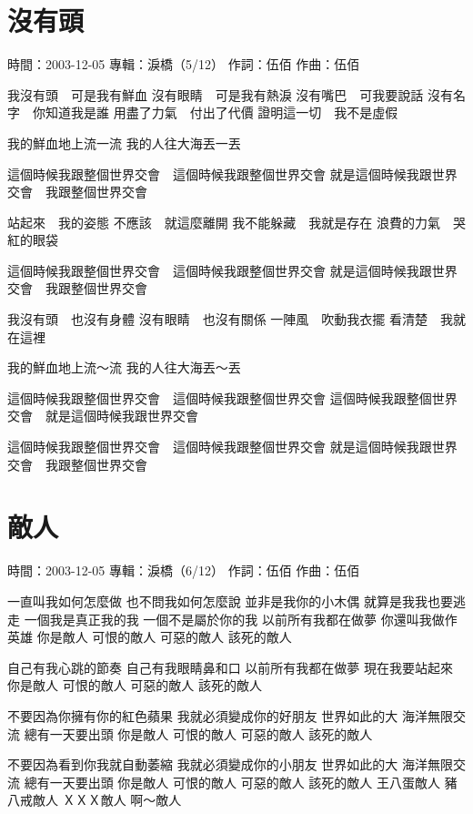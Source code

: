 \documentclass[UTF8,a4paper,oneside,twocolumn,12pt]{ctexbook}
\newcommand{\infopair}[2]{\textbullet #1：#2}
\newcommand{\zc}[1][伍佰]{\infopair{作詞}{#1}}
\newcommand{\zq}[1][伍佰]{\infopair{作曲}{#1}}
\newcommand{\zj}[1]{\infopair{專輯}{#1}}
\newcommand{\sj}[1]{\infopair{時間}{#1}}
\newenvironment{info}{\begin{flushleft}\kaishu
	}
	{\end{flushleft}\normalsize\yahei\par}
\newenvironment{lyric}{
	}
{}
\begin{document}
\section{沒有頭}
\begin{info}
	\sj{2003-12-05}
	\zj{淚橋（5/12）}
	\zc
	\zq
\end{info}
\begin{lyric}
	我沒有頭　可是我有鮮血
	沒有眼睛　可是我有熱淚
	沒有嘴巴　可我要說話
	沒有名字　你知道我是誰
	用盡了力氣　付出了代價
	證明這一切　我不是虛假

	我的鮮血地上流一流
	我的人往大海丟一丟

	這個時候我跟整個世界交會　這個時候我跟整個世界交會
	就是這個時候我跟世界交會　我跟整個世界交會

	站起來　我的姿態
	不應該　就這麼離開
	我不能躲藏　我就是存在
	浪費的力氣　哭紅的眼袋

	這個時候我跟整個世界交會　這個時候我跟整個世界交會
	就是這個時候我跟世界交會　我跟整個世界交會

	我沒有頭　也沒有身體
	沒有眼睛　也沒有關係
	一陣風　吹動我衣擺
	看清楚　我就在這裡

	我的鮮血地上流～流
	我的人往大海丟～丟

	這個時候我跟整個世界交會　這個時候我跟整個世界交會
	這個時候我跟整個世界交會　就是這個時候我跟世界交會

	這個時候我跟整個世界交會　這個時候我跟整個世界交會
	就是這個時候我跟世界交會　我跟整個世界交會
\end{lyric}

\section{敵人}
\begin{info}
	\sj{2003-12-05}
	\zj{淚橋（6/12）}
	\zc
	\zq
\end{info}
\begin{lyric}
	一直叫我如何怎麼做
	也不問我如何怎麼說
	並非是我你的小木偶
	就算是我我也要逃走
	一個我是真正我的我
	一個不是屬於你的我
	以前所有我都在做夢
	你還叫我做作英雄
	你是敵人
	可恨的敵人
	可惡的敵人
	該死的敵人

	自己有我心跳的節奏
	自己有我眼睛鼻和口
	以前所有我都在做夢
	現在我要站起來
	你是敵人
	可恨的敵人
	可惡的敵人
	該死的敵人

	不要因為你擁有你的紅色蘋果
	我就必須變成你的好朋友
	世界如此的大 海洋無限交流
	總有一天要出頭
	你是敵人
	可恨的敵人
	可惡的敵人
	該死的敵人

	不要因為看到你我就自動萎縮
	我就必須變成你的小朋友
	世界如此的大 海洋無限交流
	總有一天要出頭
	你是敵人
	可恨的敵人
	可惡的敵人
	該死的敵人
	王八蛋敵人
	豬八戒敵人
	ＸＸＸ敵人
	啊～敵人
\end{lyric}
\end{document}
